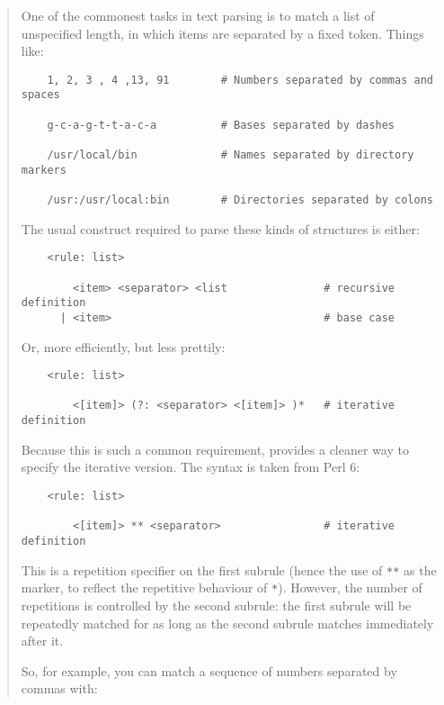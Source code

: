 \begin{it}\begin{quotation}
One of the commonest tasks in text parsing is to match a list of
unspecified length, in which items are separated by a fixed token. Things
like:

\begin{verbatim}
    1, 2, 3 , 4 ,13, 91        # Numbers separated by commas and spaces

    g-c-a-g-t-t-a-c-a          # Bases separated by dashes

    /usr/local/bin             # Names separated by directory markers

    /usr:/usr/local:bin        # Directories separated by colons
\end{verbatim}

The usual construct required to parse these kinds of structures is either:

\begin{verbatim}
    <rule: list>

        <item> <separator> <list               # recursive definition
      | <item>                                 # base case
\end{verbatim}

Or, more efficiently, but less prettily:

\begin{verbatim}
    <rule: list>

        <[item]> (?: <separator> <[item]> )*   # iterative definition
\end{verbatim}

Because this is such a common requirement,  provides a
cleaner way to specify the iterative version. The syntax is taken from
Perl 6:

\begin{verbatim}
    <rule: list>

        <[item]> ** <separator>                # iterative definition
\end{verbatim}

This is a repetition specifier on the first subrule (hence the use of \verb|**|
as the marker, to reflect the repetitive behaviour of \verb|*|). However, the
number of repetitions is controlled by the second subrule: the first
subrule will be repeatedly matched for as long as the second subrule
matches immediately after it.

So, for example, you can match a sequence of numbers separated by
commas with:


\end{quotation}
\end{it}
